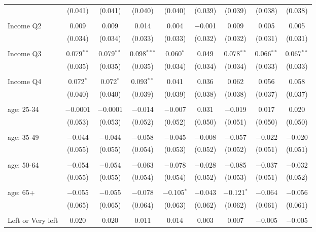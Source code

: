 \begin{tabular}{@{\extracolsep{5pt}}lcccccccc}
  & (0.041) & (0.041) & (0.040) & (0.040) & (0.039) & (0.039) & (0.038) & (0.038) \\ 
  & & & & & & & & \\ 
 Income Q2 & 0.009 & 0.009 & 0.014 & 0.004 & $-$0.001 & 0.009 & 0.005 & 0.005 \\ 
  & (0.034) & (0.034) & (0.033) & (0.033) & (0.032) & (0.032) & (0.031) & (0.031) \\ 
  & & & & & & & & \\ 
 Income Q3 & 0.079$^{**}$ & 0.079$^{**}$ & 0.098$^{***}$ & 0.060$^{*}$ & 0.049 & 0.078$^{**}$ & 0.066$^{**}$ & 0.067$^{**}$ \\ 
  & (0.035) & (0.035) & (0.035) & (0.034) & (0.034) & (0.034) & (0.033) & (0.033) \\ 
  & & & & & & & & \\ 
 Income Q4 & 0.072$^{*}$ & 0.072$^{*}$ & 0.093$^{**}$ & 0.041 & 0.036 & 0.062 & 0.056 & 0.058 \\ 
  & (0.040) & (0.040) & (0.039) & (0.039) & (0.038) & (0.038) & (0.037) & (0.037) \\ 
  & & & & & & & & \\ 
 age: 25-34 & $-$0.0001 & $-$0.0001 & $-$0.014 & $-$0.007 & 0.031 & $-$0.019 & 0.017 & 0.020 \\ 
  & (0.053) & (0.053) & (0.052) & (0.052) & (0.050) & (0.051) & (0.050) & (0.050) \\ 
  & & & & & & & & \\ 
 age: 35-49 & $-$0.044 & $-$0.044 & $-$0.058 & $-$0.045 & $-$0.008 & $-$0.057 & $-$0.022 & $-$0.020 \\ 
  & (0.055) & (0.055) & (0.054) & (0.053) & (0.052) & (0.052) & (0.051) & (0.051) \\ 
  & & & & & & & & \\ 
 age: 50-64 & $-$0.054 & $-$0.054 & $-$0.063 & $-$0.078 & $-$0.028 & $-$0.085 & $-$0.037 & $-$0.032 \\ 
  & (0.055) & (0.055) & (0.054) & (0.054) & (0.052) & (0.053) & (0.051) & (0.052) \\ 
  & & & & & & & & \\ 
 age: 65+ & $-$0.055 & $-$0.055 & $-$0.078 & $-$0.105$^{*}$ & $-$0.043 & $-$0.121$^{*}$ & $-$0.064 & $-$0.056 \\ 
  & (0.065) & (0.065) & (0.064) & (0.063) & (0.062) & (0.062) & (0.061) & (0.061) \\ 
  & & & & & & & & \\ 
 Left or Very left & 0.020 & 0.020 & 0.011 & 0.014 & 0.003 & 0.007 & $-$0.005 & $-$0.005 \\ 

\end{tabular}
